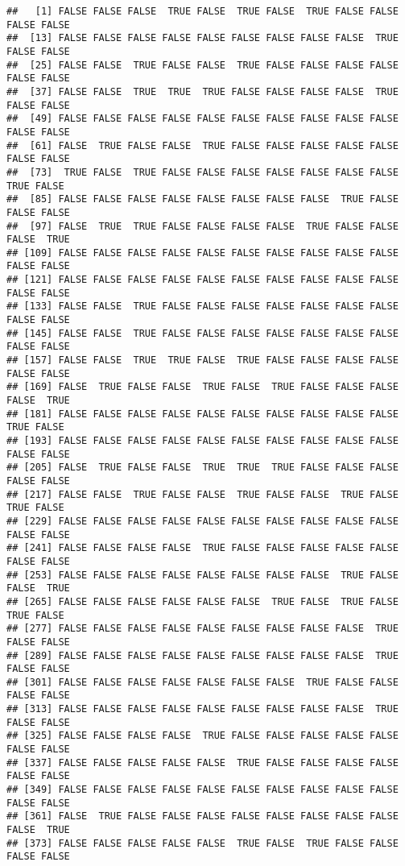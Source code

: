 \documentclass[
]{book}
\begin{document}
\begin{verbatim}
##   [1] FALSE FALSE FALSE  TRUE FALSE  TRUE FALSE  TRUE FALSE FALSE FALSE FALSE
##  [13] FALSE FALSE FALSE FALSE FALSE FALSE FALSE FALSE FALSE  TRUE FALSE FALSE
##  [25] FALSE FALSE  TRUE FALSE FALSE  TRUE FALSE FALSE FALSE FALSE FALSE FALSE
##  [37] FALSE FALSE  TRUE  TRUE  TRUE FALSE FALSE FALSE FALSE  TRUE FALSE FALSE
##  [49] FALSE FALSE FALSE FALSE FALSE FALSE FALSE FALSE FALSE FALSE FALSE FALSE
##  [61] FALSE  TRUE FALSE FALSE  TRUE FALSE FALSE FALSE FALSE FALSE FALSE FALSE
##  [73]  TRUE FALSE  TRUE FALSE FALSE FALSE FALSE FALSE FALSE FALSE  TRUE FALSE
##  [85] FALSE FALSE FALSE FALSE FALSE FALSE FALSE FALSE  TRUE FALSE FALSE FALSE
##  [97] FALSE  TRUE  TRUE FALSE FALSE FALSE FALSE  TRUE FALSE FALSE FALSE  TRUE
## [109] FALSE FALSE FALSE FALSE FALSE FALSE FALSE FALSE FALSE FALSE FALSE FALSE
## [121] FALSE FALSE FALSE FALSE FALSE FALSE FALSE FALSE FALSE FALSE FALSE FALSE
## [133] FALSE FALSE  TRUE FALSE FALSE FALSE FALSE FALSE FALSE FALSE FALSE FALSE
## [145] FALSE FALSE  TRUE FALSE FALSE FALSE FALSE FALSE FALSE FALSE FALSE FALSE
## [157] FALSE FALSE  TRUE  TRUE FALSE  TRUE FALSE FALSE FALSE FALSE FALSE FALSE
## [169] FALSE  TRUE FALSE FALSE  TRUE FALSE  TRUE FALSE FALSE FALSE FALSE  TRUE
## [181] FALSE FALSE FALSE FALSE FALSE FALSE FALSE FALSE FALSE FALSE  TRUE FALSE
## [193] FALSE FALSE FALSE FALSE FALSE FALSE FALSE FALSE FALSE FALSE FALSE FALSE
## [205] FALSE  TRUE FALSE FALSE  TRUE  TRUE  TRUE FALSE FALSE FALSE FALSE FALSE
## [217] FALSE FALSE  TRUE FALSE FALSE  TRUE FALSE FALSE  TRUE FALSE  TRUE FALSE
## [229] FALSE FALSE FALSE FALSE FALSE FALSE FALSE FALSE FALSE FALSE FALSE FALSE
## [241] FALSE FALSE FALSE FALSE  TRUE FALSE FALSE FALSE FALSE FALSE FALSE FALSE
## [253] FALSE FALSE FALSE FALSE FALSE FALSE FALSE FALSE  TRUE FALSE FALSE  TRUE
## [265] FALSE FALSE FALSE FALSE FALSE FALSE  TRUE FALSE  TRUE FALSE  TRUE FALSE
## [277] FALSE FALSE FALSE FALSE FALSE FALSE FALSE FALSE FALSE  TRUE FALSE FALSE
## [289] FALSE FALSE FALSE FALSE FALSE FALSE FALSE FALSE FALSE  TRUE FALSE FALSE
## [301] FALSE FALSE FALSE FALSE FALSE FALSE FALSE  TRUE FALSE FALSE FALSE FALSE
## [313] FALSE FALSE FALSE FALSE FALSE FALSE FALSE FALSE FALSE  TRUE FALSE FALSE
## [325] FALSE FALSE FALSE FALSE  TRUE FALSE FALSE FALSE FALSE FALSE FALSE FALSE
## [337] FALSE FALSE FALSE FALSE FALSE  TRUE FALSE FALSE FALSE FALSE FALSE FALSE
## [349] FALSE FALSE FALSE FALSE FALSE FALSE FALSE FALSE FALSE FALSE FALSE FALSE
## [361] FALSE  TRUE FALSE FALSE FALSE FALSE FALSE FALSE FALSE FALSE FALSE  TRUE
## [373] FALSE FALSE FALSE FALSE FALSE  TRUE FALSE  TRUE FALSE FALSE FALSE FALSE

\end{verbatim}
\end{document}
